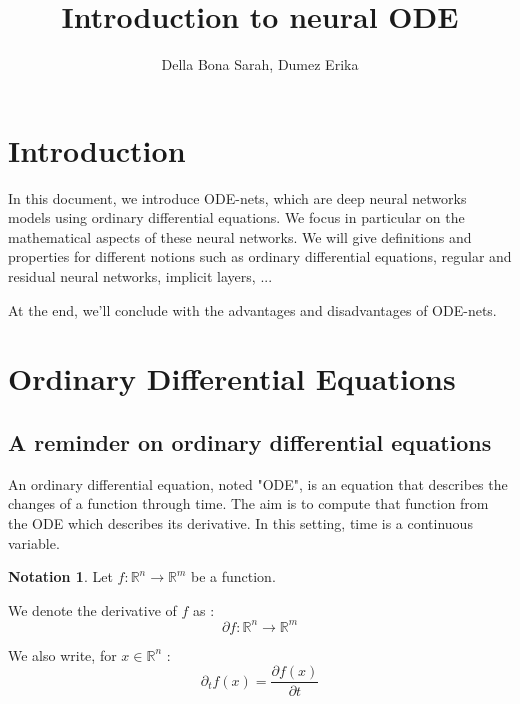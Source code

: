 \documentclass[10pt,a4paper]{article}
\author{Della Bona Sarah, Dumez Erika}
\title{Introduction to neural ODE}
\theoremstyle{definition}
\theoremstyle{definition}
\theoremstyle{definition}
\newtheorem{notation}{Notation}
\begin{document}
\maketitle

\section{Introduction}

In this document, we introduce ODE-nets, which are deep neural networks models using ordinary differential equations. We focus in particular on the mathematical aspects of these neural networks. We will give definitions and properties for different notions such as ordinary differential equations, regular and residual neural networks, implicit layers, ... 

\noindent At the end, we'll conclude with the advantages and disadvantages of ODE-nets.


\section{Ordinary Differential Equations}

\subsection{A reminder on ordinary differential equations}

An ordinary differential equation, noted "ODE", is an equation that describes the changes of a function through time. The aim is to compute that function from the ODE which describes its derivative. In this setting, time is a continuous variable.


\begin{notation}
Let $f: \mathbb{R}^n \rightarrow \mathbb{R}^m$ be a function.

We denote the derivative of $f$ as :
$$
\partial f : \mathbb{R}^n \rightarrow \mathbb{R}^m
$$

We also write, for $x \in \mathbb{R}^n$ :
$$
\partial_t f(x) = \frac{\partial f(x)}{\partial t} 
$$
\end{notation}
\end{document}
